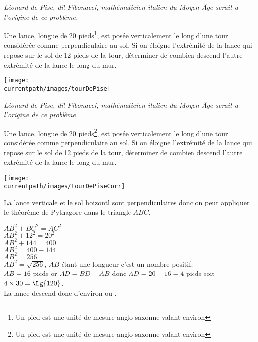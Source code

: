 \begin{exercice*}
    {\it Léonard de Pise, dit Fibonacci, mathématicien italien du Moyen Âge serait a l'origine de ce problème.}

    Une lance, longue de 20 pieds\footnote{Un pied est une unité de mesure anglo-saxonne valant environ }, est posée
    verticalement le long d'une tour considérée comme perpendiculaire au sol. Si on éloigne l'extrémité de la lance qui repose
    sur le sol de 12 pieds de la tour, déterminer de combien descend l'autre extrémité de la lance le long du mur.

    \texttt{[image: \\currentpath/images/tourDePise]}
    
\end{exercice*}
\begin{corrige}
    {\it Léonard de Pise, dit Fibonacci, mathématicien italien du Moyen Âge serait a l'origine de ce problème.}

    Une lance, longue de 20 pieds\footnote{Un pied est une unité de mesure anglo-saxonne valant environ }, est posée
    verticalement le long d'une tour considérée comme perpendiculaire au sol. Si on éloigne l'extrémité de la lance qui repose
    sur le sol de 12 pieds de la tour, déterminer de combien descend l'autre extrémité de la lance le long du mur.

    \texttt{[image: \\currentpath/images/tourDePiseCorr]}

    {\red La lance verticale et le sol hoizontl sont perpendiculaires donc on peut appliquer le théorème de Pythagore dans le triangle $ABC$.

    $AB^2+BC^2=AC^2$\\
    $AB^2+12^2=20^2$\\
    $AB^2+144=400$\\
    $AB^2=400-144$\\
    $AB^2=256$\\
    $AB^2=\sqrt{256}$, $AB$ étant une longueur c'est un nombre positif.\\
    $AB=16$ pieds or $AD=BD-AB$ donc $AD=20-16=4$ pieds soit $4\times 30=\Lg{120}$.\\
    La lance descend donc d'environ  ou .
    }
\end{corrige}

